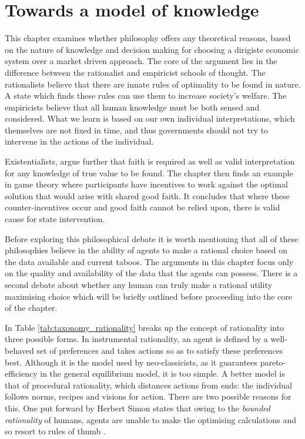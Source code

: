 \chapter{Towards a model of knowledge}

This chapter examines whether philosophy offers any theoretical reasons, based on the nature of knowledge and decision making for choosing a dirigiste economic system over a market driven approach. The core of the argument lies in the difference between the rationalist and empiricist schools of thought. The rationalists believe that there are innate rules of optimality to be found in nature. A state which finds these rules can use them to increase society's welfare. The empiricists believe that all human knowledge must be both sensed and considered. What we learn is based on our own individual interpretations, which themselves are not fixed in time, and thus governments should not try to intervene in the actions of the individual.

Existentialists, argue further that faith is required as well as valid interpretation for any knowledge of true value to be found. The chapter then finds an example in game theory where participants have incentives to work against the optimal solution that would arise with shared good faith. It concludes that where these counter-incentives occur and good faith cannot be relied upon, there is valid cause for state intervention.

Before exploring this philosophical debate it is worth mentioning that all of these philosophies believe in the ability of agents to make a rational choice based on the data available and current taboos. The arguments in this chapter focus only on the quality and availability of the data that the agents can possess. There is a second debate about whether any human can truly make a rational utility maximising choice which will be briefly outlined before proceeding into the core of the chapter.



In Table \ref{tab:taxonomy_rationality} \citep{Hargreaves:1989} breaks up the concept of rationality into three possible forms. In instrumental rationality, an agent is defined by a well-behaved set of preferences and takes actions so as to satisfy these preferences best. Although it is the model used by neo-classicists, as it guarantees pareto-efficiency in the general equilibrium model, it is too simple. A better model is that of procedural rationality, which distances actions from ends: the individual follows norms, recipes and visions for action. There are two possible reasons for this. One put forward by Herbert Simon states that owing to the \textit{bounded rationality} of humans, agents are unable to make the optimising calculations and so resort to rules of thumb \citep{Simon:1982}.

